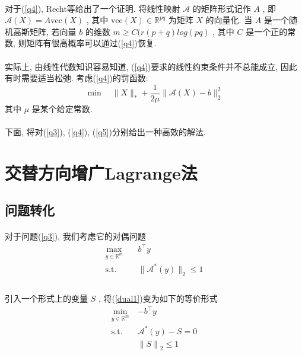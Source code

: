 \documentclass[UTF8]{ctexart}
\numberwithin{equation}{section}
\begin{document}
			\paragraph{}
				\quad 对于(\ref{q4}), Recht等给出了一个证明. 将线性映射 $\mathcal{A}$ 的矩阵形式记作 $A$ , 即 $\mathcal{A}(X) = A\text{vec}(X)$ , 其中 $\text{vec}(X) \in \mathbb{R}^{pq}$ 为矩阵 $X$ 的向量化. 当 $A$ 是一个随机高斯矩阵, 若向量 $b$ 的维数 $m \ge C(r(p + q)log(pq)$ , 其中 $C$ 是一个正的常数, 则矩阵有很高概率可以通过(\ref{q4})恢复.

			\paragraph{}
				\quad 实际上, 由线性代数知识容易知道, (\ref{q4})要求的线性约束条件并不总能成立, 因此有时需要适当松弛. 考虑(\ref{q4})的罚函数:
				\begin{equation}\label{q5}
					\min \quad \lVert{X}\rVert_*+ \frac{1}{2\mu} \lVert{\mathcal{A}(X) - b}\rVert_2^2
				\end{equation}
				其中 $\mu$ 是某个给定常数.

			\paragraph{}
				\quad 下面, 将对(\ref{q3}), (\ref{q4}), (\ref{q5})分别给出一种高效的解法.
        \section{交替方向增广Lagrange法}
		\subsection{问题转化}
			\paragraph{}
				\quad 对于问题(\ref{q3}), 我们考虑它的对偶问题
				\begin{equation}
					\begin{split}\label{dual1}
						\max_{y \in \mathbb{R}^{m}} \quad
							& b^\top y\\
						\text{s.t.} \quad
							& \lVert{\mathcal{A}^*(y)}\rVert_2 \le 1\\
					\end{split}
				\end{equation}

			\paragraph{}
				\quad 引入一个形式上的变量 $S$ , 将(\ref{dual1})变为如下的等价形式
				\begin{equation}
					\begin{split}\label{dual2}
						\min_{y \in \mathbb{R}^{m}}
							& -b^\top y\\
						\text{s.t.} \quad
							& \mathcal{A}^*(y) - S = 0\\
							& {\lVert{S}\rVert}_2 \le 1\\
					\end{split}
				\end{equation}
\end{document}
